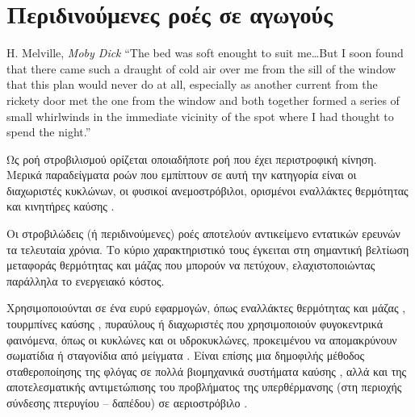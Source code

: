 
\chapter{Περιδινούμενες ροές σε αγωγούς}\label{ch:swirlflows}

\begin{chapquote}{H. Melville, \textit{Moby Dick}}
“The bed was soft enought to suit me\dots But I soon found that there came such a draught of cold air over me from the sill of the window that this plan would never do at all, especially as another current from the rickety door met the one from the window and both together formed a series of small whirlwinds in the immediate vicinity of the spot where I had thought to spend the night.”
\end{chapquote}

\ifpdf
    \graphicspath{{Chapter2/Figs/Vector/}{Chapter2/Figs/PDF/}{Chapter2/Figs/}}
\else
    \graphicspath{{Chapter2/Figs/Raster/}{Chapter2/Figs/}}
\fi



\noindent Ως ροή στροβιλισμού ορίζεται οποιαδήποτε ροή που έχει περιστροφική κίνηση. Μερικά παραδείγματα ροών που εμπίπτουν σε αυτή την κατηγορία είναι οι διαχωριστές κυκλώνων, οι φυσικοί ανεμοστρόβιλοι, ορισμένοι εναλλάκτες θερμότητας και κινητήρες καύσης \cite{1984_Gupta_BOOK}.

Οι στροβιλώδεις (ή περιδινούμενες) ροές αποτελούν αντικείμενο εντατικών ερευνών τα τελευταία χρόνια. Το κύριο χαρακτηριστικό τους έγκειται στη σημαντική βελτίωση μεταφοράς θερμότητας και μάζας που μπορούν να πετύχουν, ελαχιστοποιώντας παράλληλα το ενεργειακό κόστος.

Χρησιμοποιούνται σε ένα ευρύ εφαρμογών, όπως εναλλάκτες θερμότητας και μάζας \parencites{1976_Hong}{1986_Walsh}{2002_Bsebsu}, τουρμπίνες καύσης \cite{1986_Lede}, πυραύλους ή διαχωριστές που χρησιμοποιούν φυγοκεντρικά φαινόμενα, όπως οι κυκλώνες και οι υδροκυκλώνες, προκειμένου να απομακρύνουν σωματίδια ή σταγονίδια από μείγματα \cite{1986_Akiyama}. Είναι επίσης μια δημοφιλής μέθοδος σταθεροποίησης της φλόγας σε πολλά βιομηχανικά συστήματα καύσης \cite{2020_Δόγκας_DISSERTATION}, αλλά και της αποτελεσματικής αντιμετώπισης του προβλήματος της υπερθέρμανσης (στη περιοχής σύνδεσης πτερυγίου – δαπέδου) σε αεριοστρόβιλο \cite{2015_Μηλιδόνης_DISSERTATION}.

